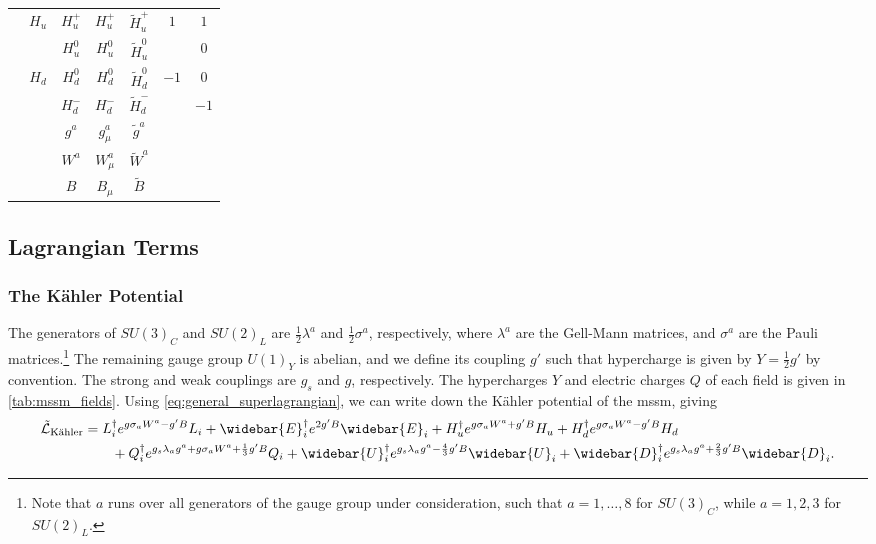 \begin{table}[t]
\begin{NiceTabular}{|c|c|c|c|c|c|c|}
         &  & $H_u^+$ & $H_u^+$ & $\tilde{H}_u^+$ &  & $1$ \\
        & & $H_u^0$ & $H_u^0$ & $\tilde{H}_u^0$ & & $0$ \\ 
        &  & $H_d^0$ & $H_d^0$ & $\tilde{H}_d^0$ &  & $0$ \\
        & & $H_d^-$ & $H_d^-$ & $\tilde{H}_d^-$ & & $-1$ \\ \hline
         & & $g^a$ & $g^a_\mu$ & $\tilde{g}^a$ \\ 
        & & $W^a$ & $W^a_\mu$ & $\tilde{W}^a$ \\ 
        & & $B$ & $B_\mu$ & $\tilde{B}$ \\ \hline
    \end{NiceTabular}
\end{table}




\subsection{Lagrangian Terms}

\subsubsection{The K\"ahler Potential}

The generators of $SU(3)_C$ and $SU(2)_L$ are $\frac{1}{2}\lambda^a$ and $\frac{1}{2}\sigma^a$, respectively, where $\lambda^a$ are the Gell-Mann matrices, and $\sigma^a$ are the Pauli matrices.\footnote{Note that $a$ runs over all generators of the gauge group under consideration, such that $a=1,\ldots,8$ for $SU(3)_C$, while $a=1,2,3$ for $SU(2)_L$.}
The remaining gauge group $U(1)_Y$ is abelian, and we define its coupling $g'$ such that hypercharge is given by $Y=\frac{1}{2}g'$ by convention. The strong and weak couplings are $g_s$ and $g$, respectively. The hypercharges $Y$ and electric charges $Q$ of each field is given in \cref{tab:mssm_fields}.
Using \cref{eq:general_superlagrangian}, we can write down the K\"ahler potential of the \gls{mssm}, giving
\begin{equation}
\label{eq:mssm_kahler}
\begin{split}
    \tilde{\mathcal{L}}_{\text{K\"ahler}} &=
    L_i^\dagger e^{g\sigma_a W^a - g'B}L_i
    + \widebar{E}_i^\dagger e^{2g'B} \widebar{E}_i
    + H_u^\dagger e^{g\sigma_a W^a + g'B} H_u
    + H_d^\dagger e^{g\sigma_a W^a - g'B} H_d
    \\ &\qquad
    + Q_i^\dagger e^{g_s\lambda_a g^a + g\sigma_a W^a + \frac{1}{3}g'B} Q_i
    + \widebar{U}_i^\dagger e^{g_s \lambda_a g^a - \frac{4}{3}g'B} \widebar{U}_i
    + \widebar{D}_i^\dagger e^{g_s \lambda_a g^a + \frac{2}{3}g'B} \widebar{D}_i.
\end{split}
\end{equation}

